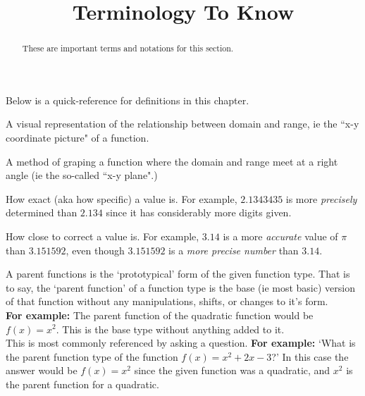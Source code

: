 \documentclass{ximera}
\title{Terminology To Know}
\begin{document}
\begin{abstract}
    These are important terms and notations for this section.
\end{abstract}
\maketitle

Below is a quick-reference for definitions in this chapter.

\begin{definition}
    A visual representation of the relationship between domain and range, ie the ``x-y coordinate picture" of a function.
\end{definition}

\begin{definition}
    A method of graping a function where the domain and range meet at a right angle (ie the so-called ``x-y plane".)
\end{definition}

\begin{definition}[Precision]
    How exact (aka how specific) a value is. For example, $2.1343435$ is more \emph{precisely} determined than $2.134$ since it has considerably more digits given.
\end{definition}

\begin{definition}[Accuracy]
    How close to correct a value is. For example, $3.14$ is a more \emph{accurate} value of $\pi$ than $3.151592$, even though $3.151592$ is a \emph{more precise number} than $3.14$.
\end{definition}

\begin{definition}
    A parent functions is the `prototypical' form of the given function type. That is to say, the `parent function' of a function type is the base (ie most basic) version of that function without any manipulations, shifts, or changes to it's form. \\
    \textbf{For example:} The parent function of the quadratic function would be $f(x) = x^2$. This is the base type without anything added to it.\\
    This is most commonly referenced by asking a question. \textbf{For example:} `What is the parent function type of the function $f(x) = x^2 + 2x - 3$?' In this case the answer would be $f(x) = x^2$ since the given function was a quadratic, and $x^2$ is the parent function for a quadratic.
\end{definition}
\end{document}
